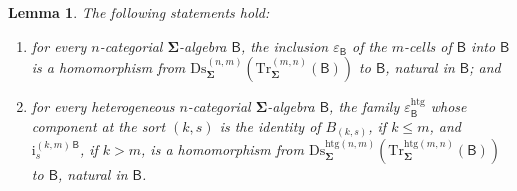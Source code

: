 \documentclass[a4paper, reqno]{amsbook}
\newcommand{\sig}[1]{\mathbf{#1}}             %
\newcommand{\calg}[1]{\boldsymbol{\mathsf{#1}}} %
\newcommand{\htg}{\mathrm{htg}}                %
\newcommand{\Ds}{\mathrm{Ds}}
\newcommand{\Tr}{\mathrm{Tr}}
\theoremstyle{plain}
\newtheorem{lemma}[theorem]{Lemma}
\theoremstyle{definition}
\begin{document}
\begin{lemma}\label{LDsTrCounit}
The following statements hold:
\begin{enumerate}
\item for every $n$-categorial $\sig{\Sigma}$-algebra $\calg{B}$, the inclusion $\varepsilon_{\calg{B}}$ of the $m$-cells of $\calg{B}$ into $\calg{B}$ is a homomorphism from $\Ds^{(n,m)}_{\sig{\Sigma}}(\Tr^{(m,n)}_{\sig{\Sigma}}(\calg{B}))$ to $\calg{B}$, natural in $\calg{B}$; and
\item for every heterogeneous $n$-categorial $\sig{\Sigma}$-algebra $\calg{B}$, the family $\varepsilon^{\htg}_{\calg{B}}$ whose component at the sort $(k,s)$ is the identity of $B_{(k,s)}$, if $k\leq m$, and $\mathrm{i}^{(k,m)\,\calg{B}}_{s}$, if $k>m$, is a homomorphism from $\Ds^{\htg(n,m)}_{\sig{\Sigma}}(\Tr^{\htg(m,n)}_{\sig{\Sigma}}(\calg{B}))$ to $\calg{B}$, natural in $\calg{B}$.
\end{enumerate}
\end{lemma}
\end{document}
